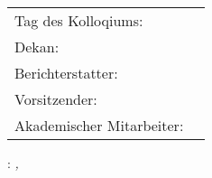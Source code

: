 \thispagestyle{empty}

\hfill
\vfill

\noindent
\begin{tabular}{ l | r}
 Tag des Kolloqiums: & \\
 Dekan: &  \\  
 Berichterstatter: & \\    
 Vorsitzender: & \\
 Akademischer Mitarbeiter: & \\
\end{tabular}
\vspace{1cm}

\noindent\myName: \textit{\myTitle,}\\%
\textcopyright\ \myTime

%
%
%
%
%
